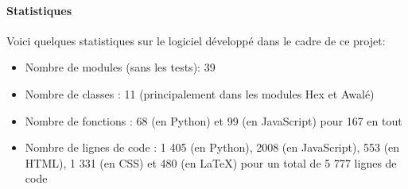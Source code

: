 \paragraph{Statistiques}
Voici quelques statistiques sur le logiciel développé dans le cadre de ce projet:
\begin{itemize}
    \item Nombre de modules (sans les tests): 39
    \item Nombre de classes : 11 (principalement dans les modules Hex et Awalé)
    \item Nombre de fonctions : 68 (en Python) et 99 (en JavaScript) pour 167 en tout
    \item Nombre de lignes de code : 1 405 (en Python), 2008 (en JavaScript), 553 (en HTML), 1 331 (en CSS)
    et 480 (en \LaTeX) pour un total de 5 777 lignes de code
\end{itemize}